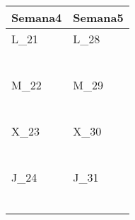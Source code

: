 	\renewcommand{\arraystretch}{1.25}\scriptsize
	\begin{longtabu} to \textwidth { X[l] X[l]}
		\centering \textbf{Semana4} &  \centering\textbf{Semana5}  \\
		\toprule
		L_{21} & L_{28} \\
		\makebox{$\square$}\dotfill & \makebox{$\square$}\dotfill \\
		\dotfill & \dotfill \\
		\makebox{$\square$}\dotfill & \makebox{$\square$}\dotfill \\
		\dotfill & \dotfill \\
		\makebox{$\square$}\dotfill & \makebox{$\square$}\dotfill \\
		\dotfill & \dotfill \\

		\hline

		M_{22} & M_{29} \\
		\makebox{$\square$}\dotfill & \makebox{$\square$}\dotfill \\
		\dotfill & \dotfill \\
		\makebox{$\square$}\dotfill & \makebox{$\square$}\dotfill \\
		\dotfill & \dotfill \\
		\makebox{$\square$}\dotfill & \makebox{$\square$}\dotfill \\
		\dotfill & \dotfill \\

		\hline

		X_{23} & X_{30} \\
		\makebox{$\square$}\dotfill & \makebox{$\square$}\dotfill \\
		\dotfill & \dotfill \\
		\makebox{$\square$}\dotfill & \makebox{$\square$}\dotfill \\
		\dotfill & \dotfill \\
		\makebox{$\square$}\dotfill & \makebox{$\square$}\dotfill \\
		\dotfill & \dotfill \\

		\hline

		J_{24} & J_{31} \\
		\makebox{$\square$}\dotfill & \makebox{$\square$}\dotfill \\
		\dotfill & \dotfill \\
		\makebox{$\square$}\dotfill & \makebox{$\square$}\dotfill \\
		\dotfill & \dotfill \\
		\makebox{$\square$}\dotfill & \makebox{$\square$}\dotfill \\
		\dotfill & \dotfill \\


\end{longtabu}

